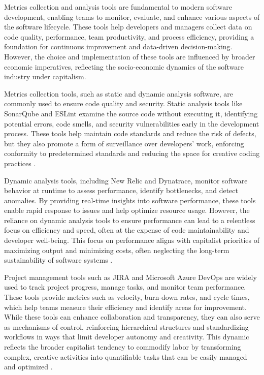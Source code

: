 \begin{refsection}
Metrics collection and analysis tools are fundamental to modern software development, enabling teams to monitor, evaluate, and enhance various aspects of the software lifecycle. These tools help developers and managers collect data on code quality, performance, team productivity, and process efficiency, providing a foundation for continuous improvement and data-driven decision-making. However, the choice and implementation of these tools are influenced by broader economic imperatives, reflecting the socio-economic dynamics of the software industry under capitalism.

Metrics collection tools, such as static and dynamic analysis software, are commonly used to ensure code quality and security. Static analysis tools like SonarQube and ESLint examine the source code without executing it, identifying potential errors, code smells, and security vulnerabilities early in the development process. These tools help maintain code standards and reduce the risk of defects, but they also promote a form of surveillance over developers' work, enforcing conformity to predetermined standards and reducing the space for creative coding practices \cite[pp.~315-318]{Spinellis2021CodeReading}.

Dynamic analysis tools, including New Relic and Dynatrace, monitor software behavior at runtime to assess performance, identify bottlenecks, and detect anomalies. By providing real-time insights into software performance, these tools enable rapid response to issues and help optimize resource usage. However, the reliance on dynamic analysis tools to ensure performance can lead to a relentless focus on efficiency and speed, often at the expense of code maintainability and developer well-being. This focus on performance aligns with capitalist priorities of maximizing output and minimizing costs, often neglecting the long-term sustainability of software systems \cite[pp.~233-236]{Allspaw2010WebOperations}.

Project management tools such as JIRA and Microsoft Azure DevOps are widely used to track project progress, manage tasks, and monitor team performance. These tools provide metrics such as velocity, burn-down rates, and cycle times, which help teams measure their efficiency and identify areas for improvement. While these tools can enhance collaboration and transparency, they can also serve as mechanisms of control, reinforcing hierarchical structures and standardizing workflows in ways that limit developer autonomy and creativity. This dynamic reflects the broader capitalist tendency to commodify labor by transforming complex, creative activities into quantifiable tasks that can be easily managed and optimized \cite[pp.~89-91]{Kim2024PhoenixProject}.


\end{refsection}
